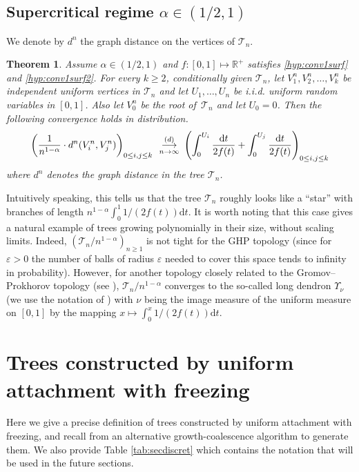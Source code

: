 \documentclass[11pt]{article}
\theoremstyle{plain}
\newtheorem{theorem}{Theorem}[section]
\theoremstyle{definition}
\theoremstyle{remark}
\newcommand{\R}{\mathbb{R}} %
\newcommand{\1}{\mathbbm{1}} %
\newcommand{\T}{\mathcal{T}} %
\newcommand{\cvloi}[1][n]{\enskip\mathop{\longrightarrow}^{(d)}_{#1 \to \infty}\enskip}
\let\originalleft\left
\let\originalright\right
\renewcommand{\left}{\mathopen{}\mathclose\bgroup\originalleft}
\renewcommand{\right}{\aftergroup\egroup\originalright}
\begin{document}
\subsection{Supercritical regime \texorpdfstring{$\alpha \in (1/2,1)$}{}}

We denote by $d^{n}$ the graph distance on the vertices of $\T_{n}$.

\begin{theorem}
\label{thm:sur-critique}
Assume $\alpha \in (1/2,1)$ and $f:[0,1]\mapsto \R^+$ satisfies \ref{hyp:conv1surf} and \ref{hyp:conv1surf2}. 
For every $k \geq 2$, conditionally given  $\T_{n}$, let $V^n_1,V^n_2,\ldots, V^n_k$ be independent uniform vertices in $\T_{n}$ {and let $U_1, \ldots, U_n$ be i.i.d. uniform random variables in $[0,1]$}. Also let $V_0^n$ be the root of  $\, \T_n$ and let $U_0=0$. Then the following convergence holds in distribution.
\[
\left( \frac{1}{n^{1-\alpha}} \cdot d^n(V^n_i,V^n_j) \right)_{0\leq i,j\leq k}\cvloi \left(  \int_{0}^{U_{i}}\frac{\mathrm{d}t}{2f(t)} +  \int_{0}^{U_{j}}\frac{\mathrm{d}t}{2f(t)}  \right)_{0\leq i,j\leq k}
\]
{where $d^n$ denotes the graph distance in the tree $\T_n$.}
\end{theorem}
Intuitively speaking, this tells us that the tree $\T_{n}$ roughly looks like a ``star'' with branches of length $n^{1-\alpha} \int_0^1 1/(2f(t)) {\mathrm{d}t}$.  It is worth noting that  this case gives a natural example of trees growing polynomially in their size, without scaling limits. Indeed, $(\T_{n}/n^{1-\alpha})_{n \geq 1}$ is not tight for the GHP topology (since for $\varepsilon>0$ the number of balls of radius $\varepsilon$ needed to cover this space tends to infinity in probability). However, for another topology closely related to the Gromov--Prokhorov topology (see \cite{ET21,Jan21}),  $\T_{n}/n^{1-\alpha}$ converges to the so-called long dendron $\Upsilon_{\nu}$ (we use the notation of \cite[Example 3.12]{Jan21}) with $\nu$ being the image measure of the uniform measure on $[0,1]$ by the mapping $x \mapsto \int_0^x 1/(2f(t)) {\mathrm{d}t} $.


\section{Trees constructed by uniform attachment with freezing}
\label{sec:discret}


Here we give a precise definition of trees constructed by uniform attachment with freezing, and recall from \cite{BBKK23+} an alternative growth-coalescence algorithm to generate them. We also provide Table \ref{tab:secdiscret} which contains the notation that will be used in the future sections.
\end{document}
